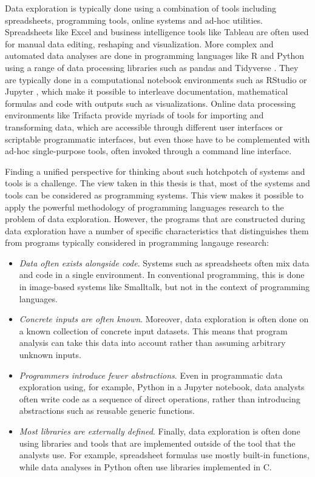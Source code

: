 \documentclass[fleqn,11pt]{report}
\begin{document}
Data exploration is typically done using a combination of tools including spreadsheets,
programming tools, online systems and ad-hoc utilities. Spreadsheets like Excel and business
intelligence tools like Tableau \citep{wesley-2011-tableau} are often used for manual data
editing, reshaping and visualization. More complex and automated data analyses are done in
programming languages like R and Python using a range of data processing libraries such as
pandas and Tidyverse \citep{wickham-2019-tidyverse}. They are typically done in a computational
notebook environments such as RStudio or Jupyter \citep{kluyver-2016-jupyter}, which make
it possible to interleave documentation, mathematical formulas and code with outputs such as
visualizations. Online data processing environments like Trifacta provide myriads of tools for
importing and transforming data, which are accessible through different user interfaces or
scriptable programmatic interfaces, but even those have to be complemented with ad-hoc
single-purpose tools, often invoked through a command line interface.

Finding a unified perspective for thinking about such hotchpotch of systems and tools
is a challenge. The view taken in this thesis is that, most of the systems and tools can be
considered as programming systems. This view makes it possible to apply the powerful methodology
of programming languages research to the problem of data exploration.
However, the programs that are constructed during data exploration have a number of specific
characteristics that distinguishes them from programs typically considered in programming
langauge research:

\begin{itemize}
\item \emph{Data often exists alongside code}. Systems such as spreadsheets often mix
  data and code in a single environment. In conventional programming, this is done in
  image-based systems like Smalltalk, but not in the context of programming languages.

\item \emph{Concrete inputs are often known}. Moreover, data exploration is often done on a
  known collection of concrete input datasets. This means that program analysis can take
  this data into account rather than assuming arbitrary unknown inputs.

\item \emph{Programmers introduce fewer abstractions}. Even in programmatic data exploration using,
  for example, Python in a Jupyter notebook, data analysts often write code as a sequence of
  direct operations, rather than introducing abstractions such as reusable generic functions.

\item \emph{Most libraries are externally defined}. Finally, data exploration is
  often done using libraries and tools that are implemented outside of the tool that the analysts
  use. For example, spreadsheet formulas use mostly built-in functions, while data analyses in
  Python often use libraries implemented in C.
\end{itemize}
\end{document}
